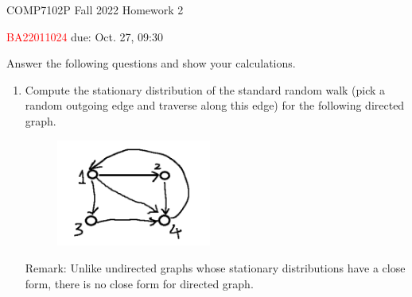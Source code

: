



\noindent
\hspace*{.2in} COMP7102P Fall 2022
\hfill Homework 2\\
\begin{CJK}{UTF8}{gbsn}
    \hspace*{.2in} \textcolor{red}{BA22011024 \Name{} \ChineseName} \hfill due: Oct. 27, 09:30
\end{CJK}
\bigskip


\begin{problem}[30 points] Answer the following questions and show your calculations.
\begin{enumerate}
  \item Compute the stationary distribution of the standard random walk (pick a random outgoing edge and traverse along this edge) for the following directed graph.
 \begin{figure}[H]
      \centering
 \includegraphics[width=2in]{images/123.png}
\end{figure}     
   Remark: Unlike undirected graphs whose stationary distributions have a close form, there is no close form for directed graph.
   

\end{enumerate}
\end{problem}
